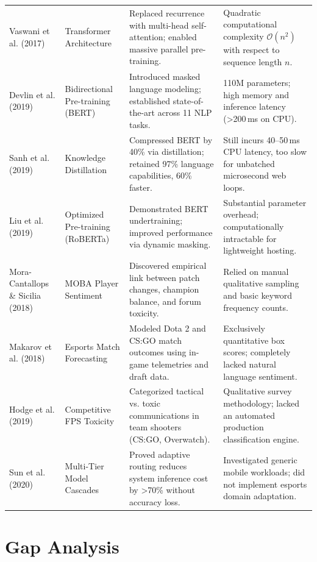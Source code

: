 \begin{table}[htbp]
\begin{tabularx}{\textwidth}{P{2.6cm} P{2.8cm} L L}
Vaswani et al. (2017) \cite{vaswani2017attention} & Transformer Architecture & Replaced recurrence with multi-head self-attention; enabled massive parallel pre-training. & Quadratic computational complexity $\mathcal{O}(n^2)$ with respect to sequence length $n$. \\
\addlinespace
Devlin et al. (2019) \cite{devlin2019bert} & Bidirectional Pre-training (BERT) & Introduced masked language modeling; established state-of-the-art across 11 NLP tasks. & 110M parameters; high memory and inference latency (>200\,ms on CPU). \\
\addlinespace
Sanh et al. (2019) \cite{sanh2019distilbert} & Knowledge Distillation & Compressed BERT by 40\% via distillation; retained 97\% language capabilities, 60\% faster. & Still incurs 40--50\,ms CPU latency, too slow for unbatched microsecond web loops. \\
\addlinespace
Liu et al. (2019) \cite{liu2019roberta} & Optimized Pre-training (RoBERTa) & Demonstrated BERT undertraining; improved performance via dynamic masking. & Substantial parameter overhead; computationally intractable for lightweight hosting. \\
\addlinespace
Mora-Cantallops \& Sicilia (2018) \cite{mora2018exploring} & MOBA Player Sentiment & Discovered empirical link between patch changes, champion balance, and forum toxicity. & Relied on manual qualitative sampling and basic keyword frequency counts. \\
\addlinespace
Makarov et al. (2018) \cite{makarov2018predicting} & Esports Match Forecasting & Modeled Dota 2 and CS:GO match outcomes using in-game telemetries and draft data. & Exclusively quantitative box scores; completely lacked natural language sentiment. \\
\addlinespace
Hodge et al. (2019) \cite{hodge2019toxicity} & Competitive FPS Toxicity & Categorized tactical vs. toxic communications in team shooters (CS:GO, Overwatch). & Qualitative survey methodology; lacked an automated production classification engine. \\
\addlinespace
Sun et al. (2020) \cite{sun2020mobilebert} & Multi-Tier Model Cascades & Proved adaptive routing reduces system inference cost by >70\% without accuracy loss. & Investigated generic mobile workloads; did not implement esports domain adaptation. \\
\bottomrule
\end{tabularx}
\end{table}

\section{Gap Analysis}
\label{sec:gap_analysis}

